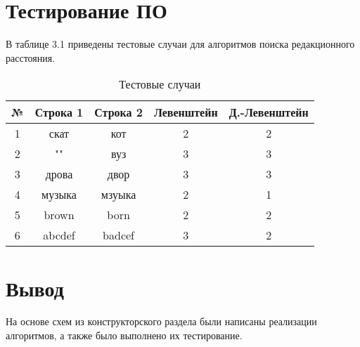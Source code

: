\section{Тестирование ПО}

В таблице 3.1 приведены тестовые случаи для алгоритмов поиска редакционного расстояния.

\begin{table}[H]
	\begin{center}
		\caption{Тестовые случаи}
		\begin{tabular}{c|c|c|c|c}
			№ & Строка 1 & Строка 2 & Левенштейн & Д.-Левенштейн\\
			\hline
			1 & скат & кот & 2 & 2\\
			2 & "" & вуз & 3 & 3\\
			3 & дрова & двор & 3 & 3\\
			4 & музыка & мзуыка & 2 & 1\\
			5 & brown & born & 2 & 2\\
			6 & abcdef & badcef & 3 & 2\\
		\end{tabular}
	\end{center}
\end{table}

\section{Вывод}

На основе схем из конструкторского раздела были написаны реализации алгоритмов, а также было выполнено их тестирование.